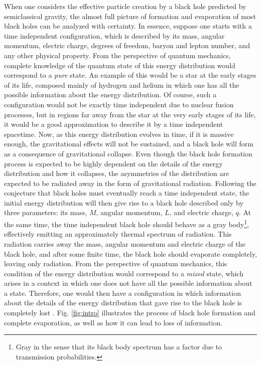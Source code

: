 \documentclass[
12pt,		%
openright,	%
twoside,  %
a4paper,			%
chapter=TITLE,		%
english,			%
french,				%
spanish,			%
brazil				%
]{USPSC-classe/USPSC}
\begin{document}
When one considers the effective particle creation by a black hole predicted by semiclassical gravity, the almost full picture of formation and evaporation of most black holes can be analyzed with certainty. In essence, suppose one starts with a time independent configuration, which is described by its mass, angular momentum, electric charge, degrees of freedom, baryon and lepton number, and any other physical property. From the perspective of quantum mechanics, complete knowledge of the quantum state of this energy distribution would correspond to a \textit{pure} state. An example of this would be a star at the early stages of its life, composed mainly of hydrogen and helium in which one has all the possible information about the energy distribution. Of course, such a configuration would not be exactly time independent due to nuclear fusion processes, but in regions far away from the star at the very early stages of its life, it would be a good approximation to describe it by a time independent spacetime. Now, as this energy distribution evolves in time, if it is massive enough, the gravitational effects will not be sustained, and a black hole will form as a consequence of gravitational collapse. Even though the black hole formation process is expected to be highly dependent on the details of the energy distribution and how it collapses, the asymmetries of the distribution are expected to be radiated away in the form of gravitational radiation. Following the conjecture that black holes must eventually reach a time independent state, the initial energy distribution will then give rise to a black hole described only by three parameters: its mass, $M$, angular momentum, $L$, and electric charge, $q$. At the same time, the time independent black hole should behave as a gray body\footnote{Gray in the sense that its black body spectrum has a factor due to transmission probabilities.}, effectively emitting an approximately thermal spectrum of radiation. This radiation carries away the mass, angular momentum and electric charge of the black hole, and after some finite time, the black hole should evaporate completely, leaving only radiation. From the perspective of quantum mechanics, this condition of the energy distribution would correspond to a \textit{mixed} state, which arises in a context in which one does not have all the possible information about a state. Therefore, one would then have a configuration in which information about the details of the energy distribution that gave rise to the black hole is completely lost \cite{Hawking1976, Unruh2017}. Fig. \ref{fig:intro} illustrates the process of black hole formation and complete evaporation, as well as how it can lead to loss of information.
\end{document}
